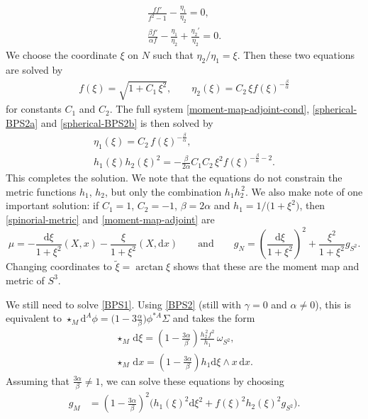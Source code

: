 \documentclass[10pt,a4paper]{amsart}
\newcommand{\1}{{\mathbb{1}}}
\def \d{\mathrm{d}}
\numberwithin{equation}{section}
\begin{document}
\begin{gather*}
\frac{ff'}{f^2-1}-\frac{\eta_1}{\eta_2} =0, \\
\frac{\beta f'}{\alpha f} - \frac{\eta_1}{\eta_2} +\frac{\eta_2'}{\eta_2}=0.
\end{gather*}
We choose the coordinate $\xi$ on $N$ such that $\eta_2/\eta_1=\xi$. Then these two equations are solved by
\begin{align*}
f(\xi)= \sqrt{1+C_1\,\xi^2},\qquad
\eta_2(\xi) = C_2\,\xi f(\xi)^{-\frac{\beta}{\alpha}}
\end{align*}
for constants $C_1$ and $C_2$. The full system \eqref{moment-map-adjoint-cond}, \eqref{spherical-BPS2a} and \eqref{spherical-BPS2b} is then solved by
\begin{gather*}
\eta_1(\xi) = C_2\,f(\xi)^{-\frac{\beta}{\alpha}},\nonumber \\
h_1(\xi)h_2(\xi)^2 = -\frac{\beta}{2\alpha}C_1C_2\,\xi^2 f(\xi)^{-\frac{\beta}{\alpha}-2}.%
\end{gather*}
This completes the solution. We note that the equations do not constrain the metric functions $h_1$, $h_2$, but only the combination $h_1h_2^{\,2}$. We also make note of one important solution: if $C_1=1$, $C_2=-1$, $\beta=2\alpha$ and $h_1=1/\big(1+\xi^2\big)$, then \eqref{spinorial-metric} and \eqref{moment-map-adjoint} are{\samepage
\begin{equation*}
\mu = -\frac{\d\xi}{1+\xi^2}(X,x)-\frac{\xi}{1+\xi^2}(X,\d x)\qquad\text{and}\qquad g_N = \left(\frac{\d\xi}{1+\xi^2}\right)^2 + \frac{\xi^2}{1+\xi^2}g_{S^2}.
\end{equation*}
Changing coordinates to $\tilde{\xi}=\arctan\xi$ shows that these are the moment map and metric of $S^3$.}

We still need to solve \eqref{BPS1}. Using \eqref{BPS2} (still with $\gamma=0$ and $\alpha\neq0$), this is equivalent to $\star_{M} \d^A\phi = \big(1-3\frac{\alpha}{\beta}\big)\phi^{\ast A}\Sigma$ and takes the form
\begin{gather*}
\star_{M}\,\d\xi = \left(1-\frac{3\alpha}{\beta}\right)\frac{h_2^{\,2}f^2}{h_1}\,\omega_{S^2}, \\
\star_{M}\,\d x = \left(1-\frac{3\alpha}{\beta}\right)h_1 \d\xi\wedge x\,\d x.
\end{gather*}
Assuming that $\frac{3\alpha}{\beta}\neq1$, we can solve these equations by choosing
\begin{align*}
g_M &= \left(1-\frac{3\alpha}{\beta}\right)^2\bigl(h_1(\xi)^2\d\xi^2 + f(\xi)^2h_2(\xi)^2g_{S^2}\bigr).
\end{align*}
\end{document}
